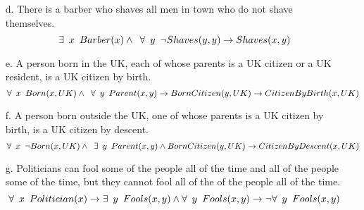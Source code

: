 \documentclass[11pt]{article}
\begin{document}
\begin{flushleft}
\begin{enumerate}
    \item[d.] There is a barber who shaves all men in town who do not shave
        themselves.
        $$ \exists \hspace{0.5em} x \hspace{0.5em} Barber(x) \wedge
        \hspace{0.5em} \forall \hspace{0.5em} y \hspace{0.5em} \neg Shaves(y,
        y) \rightarrow Shaves(x, y) $$

    \item[e.] A person born in the UK, each of whose parents is a UK
        citizen or a UK resident, is a UK citizen by birth.
        $$ \forall \hspace{0.5em} x \hspace{0.5em} Born(x, UK) \wedge
        \hspace{0.5 em} \forall \hspace{0.5em} y \hspace{0.5em} Parent(x, y)
        \rightarrow BornCitizen(y, UK) \rightarrow CitizenByBirth(x, UK) $$

    \item[f.] A person born outside the UK, one of whose parents is a UK
        citizen by birth, is a UK citizen by descent.
        $$ \forall \hspace{0.5em} x \hspace{0.5em} \neg Born(x, UK) \wedge
        \hspace{0.5em} \exists \hspace{0.5em} y \hspace{0.5em} Parent(x, y)
        \wedge BornCitizen(y, UK) \rightarrow CitizenByDescent(x, UK) $$

    \item[g.] Politicians can fool some of the people all of the time and all
        of the people some of the time, but they cannot fool all of the
        of the people all of the time.
        $$ \forall \hspace{0.5em} x \hspace{0.5em} Politician(x) \rightarrow
        \exists \hspace{0.5em} y \hspace{0.5em} Fools(x, y) \wedge \forall
        \hspace{0.5em} y \hspace{0.5em} Fools(x, y) \rightarrow \neg \forall
        \hspace{0.5em} y \hspace{0.5em} Fools(x, y) $$


\end{enumerate}
\end{flushleft}
\end{document}
